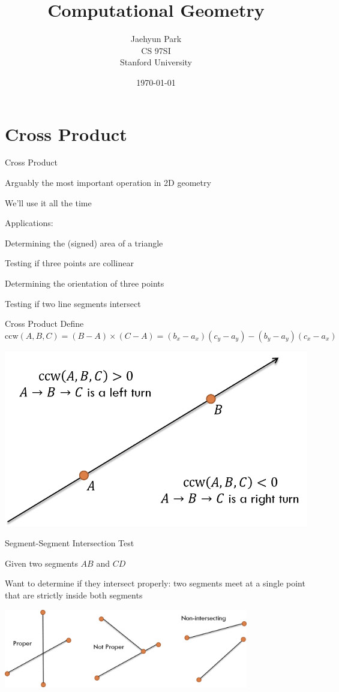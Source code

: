 \documentclass[13pt,onlymath]{beamer}
\title{\large \bfseries Computational Geometry}
\author{Jaehyun Park\\[3ex]
CS 97SI\\
Stanford University}
\date{\today}
\begin{document}
\frame{
\thispagestyle{empty}
\titlepage
}

\section{Cross Product}
\begin{frame}{Cross Product}
\BIT
\item Arguably the most important operation in 2D geometry
\item We'll use it all the time
\vfill
\item Applications:
\BIT
\item Determining the (signed) area of a triangle
\item Testing if three points are collinear
\item Determining the orientation of three points
\item Testing if two line segments intersect
\EIT \EIT
\end{frame}

\begin{frame}{Cross Product}
Define $\mathrm{ccw}(A, B, C) = (B-A) \times (C-A) = (b_x-a_x)(c_y-a_y)-(b_y-a_y)(c_x-a_x)$
\begin{center}
\includegraphics[height=0.5\textheight]{figures/ccw}
\end{center}
\end{frame}

\begin{frame}{Segment-Segment Intersection Test}
\BIT
\item Given two segments $AB$ and $CD$
\item Want to determine if they intersect properly: two segments meet at a single point that are strictly inside both segments
\EIT
\begin{center}
\includegraphics[width=0.8\textwidth]{figures/seg_intersection}
\end{center}
\end{frame}
\end{document}
